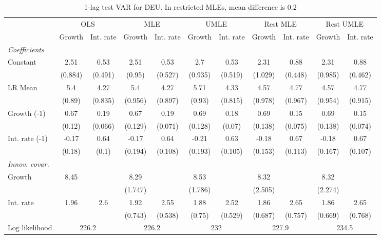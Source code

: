 \begin{table}[htbp] 
	\centering
	\begin{tabular}{@{\extracolsep{4pt}}lcccccccccc@{}}		\hline\hline
		 		 & \multicolumn{2}{c}{OLS} &\multicolumn{2}{c}{MLE} &\multicolumn{2}{c}{UMLE} &\multicolumn{2}{c}{Rest MLE} &\multicolumn{2}{c}{Rest UMLE} \\ 
 		 & Growth 	 & Int. rate 	 & Growth 	 & Int. rate 	 & Growth 	 & Int. rate 	 & Growth 	 & Int. rate 	 & Growth 	 & Int. rate\\\cline{2-3}\cline{4-5}\cline{6-7}\cline{8-9}\cline{10-11}
\rule{0pt}{4ex} 
 \emph{Coefficients} 	  		 & 		 & 		 & 		 & 		 & 		 & 		 & 		 & 		 & 		 &\\ 
\quad Constant 	 & 2.51 	 & 0.53 	 & 2.51 	 & 0.53 	 & 2.7 	 & 0.53 	 & 2.31 	 & 0.88 	 & 2.31 	 & 0.88	 \\ 
 		 & (0.884) 	 & (0.491) 	 & (0.95) 	 & (0.527) 	 & (0.935) 	 & (0.519) 	 & (1.029) 	 & (0.448) 	 & (0.985) 	 & (0.462) 	 \\ 
\quad LR Mean 	 & 5.4 	 & 4.27 	 & 5.4 	 & 4.27 	 & 5.71 	 & 4.33 	 & 4.57 	 & 4.77 	 & 4.57 	 & 4.77	 \\ 
 		 & (0.89) 	 & (0.835) 	 & (0.956) 	 & (0.897) 	 & (0.93) 	 & (0.815) 	 & (0.978) 	 & (0.967) 	 & (0.954) 	 & (0.915) 	 \\ 
\quad Growth (-1) 	 &0.67 	 & 0.19 	 & 0.67 	 & 0.19 	 & 0.69 	 & 0.18 	 & 0.69 	 & 0.15 	 & 0.69 	 & 0.15	 \\ 
 		 & (0.12) 	 & (0.066) 	 & (0.129) 	 & (0.071) 	 & (0.128) 	 & (0.07) 	 & (0.138) 	 & (0.075) 	 & (0.138) 	 & (0.074) 	 \\ 
\quad Int. rate (-1) 	 &-0.17 	 & 0.64 	 & -0.17 	 & 0.64 	 & -0.21 	 & 0.63 	 & -0.18 	 & 0.67 	 & -0.18 	 & 0.67	 \\ 
 		 & (0.18) 	 & (0.1) 	 & (0.194) 	 & (0.108) 	 & (0.193) 	 & (0.105) 	 & (0.153) 	 & (0.113) 	 & (0.167) 	 & (0.107) 	 \\ 
\rule{0pt}{4ex} \emph{Innov. covar.}  	 & 	 & 	 & 	 & 	 & 	 & 	 & 	 & 	 & 	 &\\ 
\quad Growth 	 &8.45 	 &  	 & 8.29 	 &  	 & 8.53 	 &  	 & 8.32 	 &  	 & 8.32 	 & 	 \\ 
 		 &  	 &  	 & (1.747) 	 &  	 & (1.786) 	 &  	 & (2.505) 	 &  	 & (2.274) 	 &  	 \\ 
\quad Int. rate 	 &1.96 	 & 2.6 	 & 1.92 	 & 2.55 	 & 1.88 	 & 2.52 	 & 1.86 	 & 2.65 	 & 1.86 	 & 2.65	 \\ 
 		 &  	 &  	 & (0.743) 	 & (0.538) 	 & (0.75) 	 & (0.529) 	 & (0.687) 	 & (0.757) 	 & (0.669) 	 & (0.768) 	 \\ 
 \hline \rule{0pt}{4ex} 
  Log likelihood 	 &\multicolumn{2}{c}{226.2} 	 & \multicolumn{2}{c}{226.2} 	 & \multicolumn{2}{c}{232} 	 & \multicolumn{2}{c}{227.9} 	 & \multicolumn{2}{c}{234.5}\\ 

 \hline 	\end{tabular}		\caption{1-lag test VAR for DEU. In restricted MLEs, mean difference is 0.2}
		\label{tab:DEU1lag}

\end{table}